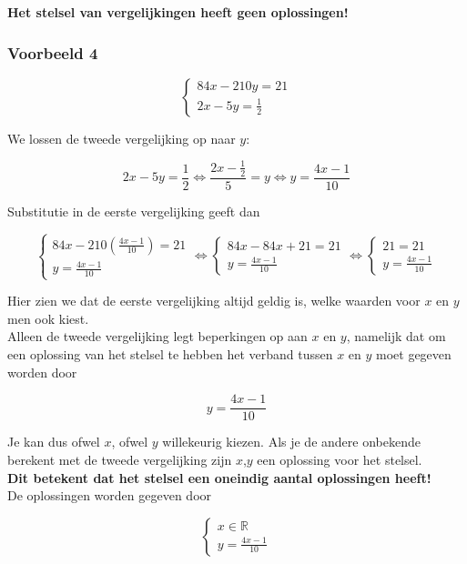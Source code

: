 {\bf Het stelsel van vergelijkingen heeft geen oplossingen!}

\subsubsection{Voorbeeld 4}

\[\left\{ \begin{array}{l}
84x-210y=21\\
2x-5y = \frac{1}{2}
\end{array} \right.\]

We lossen de tweede vergelijking op naar $y$:

\[ 2x-5y = \frac{1}{2} \Leftrightarrow \frac{2x-\frac{1}{2}}{5}=y \Leftrightarrow y=\frac{4x-1}{10} \]

Substitutie in de eerste vergelijking geeft dan

\[\left\{ \begin{array}{l}
84x-210(\frac{4x-1}{10})=21 \\
y=\frac{4x-1}{10}
\end{array} \right. \Leftrightarrow \left\{ \begin{array}{l}
84x-84x+21=21 \\
y=\frac{4x-1}{10}
\end{array} \right. \Leftrightarrow \left\{ \begin{array}{l}
21=21\\
y=\frac{4x-1}{10}
\end{array} \right.\]

Hier zien we dat de eerste vergelijking altijd geldig is, welke waarden voor $x$ en $y$ men ook kiest.\\
Alleen de tweede vergelijking legt beperkingen op aan $x$ en $y$, namelijk dat om een oplossing van het stelsel te hebben het verband tussen $x$ en $y$ moet gegeven worden door

\[ y=\frac{4x-1}{10} \]

Je kan dus ofwel $x$, ofwel $y$ willekeurig kiezen. Als je de andere onbekende berekent met de tweede vergelijking zijn $x$,$y$ een oplossing voor het stelsel.\\

{\bf Dit betekent dat het stelsel een oneindig aantal oplossingen heeft!} \\

De oplossingen worden gegeven door

\[\left\{ \begin{array}{l}
x \in \mathbb{R} \\
y=\frac{4x-1}{10}
\end{array} \right. \]


